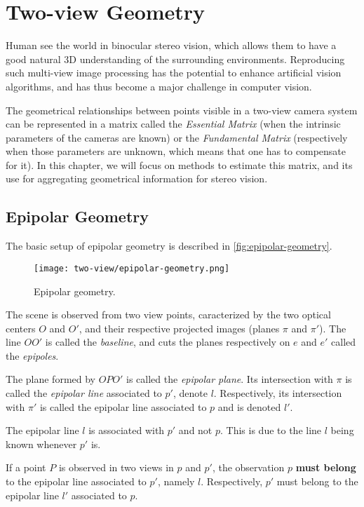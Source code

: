 \section{Two-view Geometry}
Human see the world in binocular stereo vision, which allows them to have a good natural 3D understanding of the surrounding environments. Reproducing such multi-view image processing has the potential to enhance artificial vision algorithms, and has thus become a major challenge in computer vision.

The geometrical relationships between points visible in a two-view camera system can be represented in a matrix called the \emph{Essential Matrix} (when the intrinsic parameters of the cameras are known) or the \emph{Fundamental Matrix} (respectively when those parameters are unknown, which means that one has to compensate for it). In this chapter, we will focus on methods to estimate this matrix, and its use for aggregating geometrical information for stereo vision.

\subsection{Epipolar Geometry}
The basic setup of epipolar geometry is described in \autoref{fig:epipolar-geometry}.
\begin{figure}[H]
    \centering
    \texttt{[image: two-view/epipolar-geometry.png]}
    \caption{Epipolar geometry.}
    \label{fig:epipolar-geometry}
\end{figure}
The scene is observed from two view points, caracterized by the two optical centers $O$ and $O'$, and their respective projected images (planes $\pi$ and $\pi'$). The line $OO'$ is called the \emph{baseline}, and cuts the planes respectively on $e$ and $e'$ called the \emph{epipoles}. 

The plane formed by $OPO'$ is called the \emph{epipolar plane}. Its intersection with $\pi$ is called the \emph{epipolar line} associated to $p'$, denote $l$. Respectively, its intersection with $\pi'$ is called the epipolar line associated to $p$ and is denoted $l'$.

\begin{remark}
    The epipolar line $l$ is associated with $p'$ and not $p$. This is due to the line $l$ being known whenever $p'$ is.
\end{remark}

\begin{theorem}
    \label{thm:epipolar-constraint}
    If a point $P$ is observed in two views in $p$ and $p'$, the observation $p$ \textbf{must belong} to the epipolar line associated to $p'$, namely $l$. Respectively, $p'$ must belong to the epipolar line $l'$ associated to $p$.
\end{theorem}

